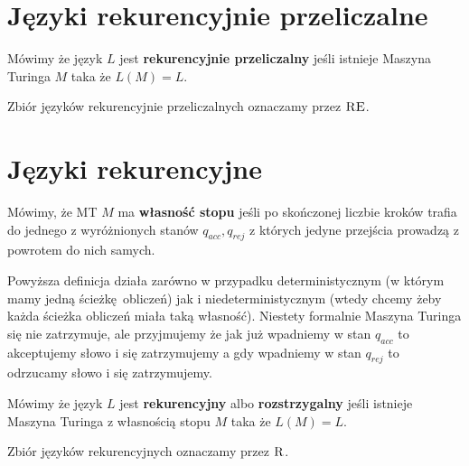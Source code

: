 \section {Języki rekurencyjnie przeliczalne}

\begin{definition}
    Mówimy że język \( L \) jest \textbf{rekurencyjnie przeliczalny} jeśli istnieje Maszyna Turinga \( M \) taka że \( L(M) = L \).
    
    Zbiór języków rekurencyjnie przeliczalnych oznaczamy przez \( \textsc{RE} \).
\end{definition}

\section {Języki rekurencyjne}

\begin{definition}
    Mówimy, że MT \( M \) ma \textbf{własność stopu} jeśli po skończonej liczbie kroków trafia do jednego z wyróżnionych stanów \( q_{acc}, q_{rej} \) z których jedyne przejścia prowadzą z powrotem do nich samych.
\end{definition}

Powyższa definicja działa zarówno w przypadku deterministycznym (w którym mamy jedną ścieżkę obliczeń) jak i niedeterministycznym (wtedy chcemy żeby każda ścieżka obliczeń miała taką własność).
Niestety formalnie Maszyna Turinga się nie zatrzymuje, ale przyjmujemy że jak już wpadniemy w stan \( q_{acc} \) to akceptujemy słowo i się zatrzymujemy a gdy wpadniemy w stan \( q_{rej} \) to odrzucamy słowo i się zatrzymujemy.

\begin{definition}
    Mówimy że język \( L \) jest \textbf{rekurencyjny} albo \textbf{rozstrzygalny} jeśli istnieje Maszyna Turinga z własnością stopu \( M \) taka że \( L(M) = L \).
    
    Zbiór języków rekurencyjnych oznaczamy przez \( \textsc{R} \).
\end{definition}
